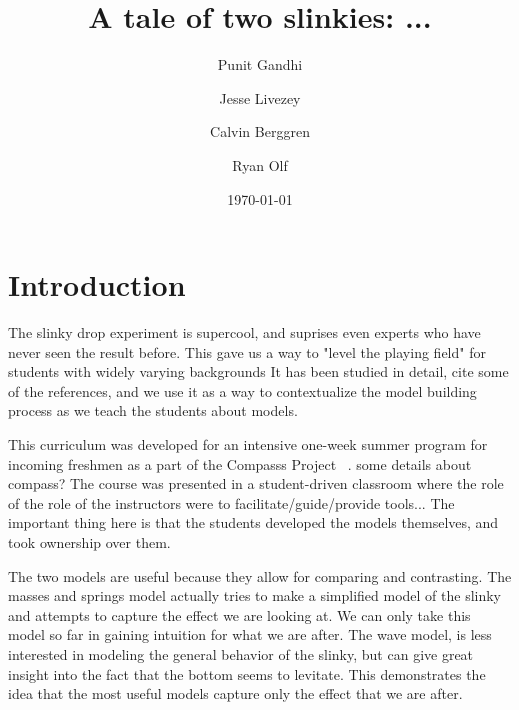 \documentclass[aps,pra,twocolumn,10pt,superscriptaddress,showpacs,amsmath,amssymb,nofootinbib]{revtex4-1}
\begin{document}
\title{A tale of two slinkies: ...}
\author{Punit  Gandhi}
\author{Jesse Livezey}
\author{Calvin Berggren}
\author{Ryan Olf}
\date{\today}

\begin{abstract}

\end{abstract}

\maketitle

\section{Introduction}
The slinky drop experiment is supercool, and suprises even experts who have never seen the result before.  This gave us a way to "level the playing field" for students with widely varying backgrounds    It has been studied in detail, cite some of the references, and we use it as a way to contextualize the model building process as we teach the students about models. 

This curriculum was developed for an intensive one-week summer program for incoming freshmen as a part of the Compasss Project ~\cite{albana2013}. some details about compass?  The course was presented in a student-driven classroom where the role of the role of the instructors were to facilitate/guide/provide tools...  The important thing here is that the students developed the models themselves, and took ownership over them.  

The two models are useful because they allow for comparing and contrasting. The masses and springs model actually tries to make a simplified model of the slinky and attempts to capture the effect we are looking at.  We can only take this model so far in gaining intuition for what we are after.    The wave model, is less interested in modeling the general behavior of the slinky, but can give great insight into the fact that the bottom seems to levitate.  This demonstrates the idea that the most useful  models  capture only the effect that we are after. 
\end{document}
